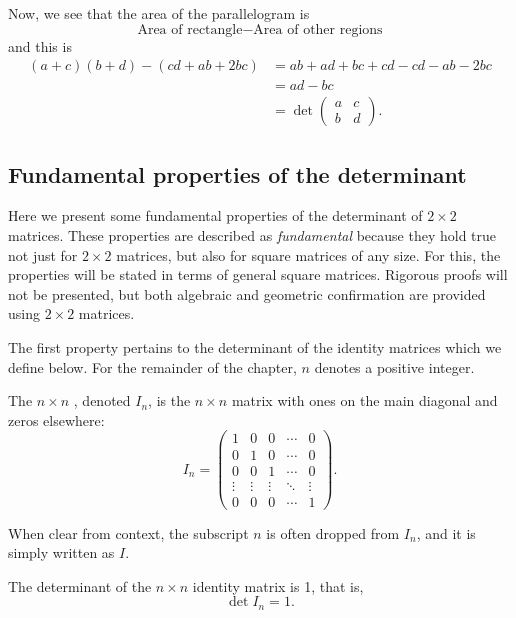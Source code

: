 \documentclass{ximera}
\begin{document}
Now, we see that the area of the parallelogram is
\[
\text{Area of rectangle} - \text{Area of other regions}
\]
and this is
\begin{align*}
  (a+c)(b+d) - \left(cd + ab + 2bc \right)&= ab + ad + bc + cd - cd - ab-2bc\\
  &=  ad - bc\\
  &= \det
  \begin{pmatrix}
    a & c\\
    b & d
  \end{pmatrix}.
\end{align*}

\subsection{Fundamental properties of the determinant}
Here we present some fundamental properties of the determinant of
$2 \times 2$ matrices. These properties are described as
\textit{fundamental} because they hold true not just for $2 \times 2$
matrices, but also for square matrices of any size. For this, the
properties will be stated in terms of general square
matrices. Rigorous proofs will not be presented, but both algebraic
and geometric confirmation are provided using $2 \times 2$ matrices.

The first property pertains to the determinant of the identity
matrices which we define below. For the remainder of the chapter, $n$
denotes a positive integer.

\begin{definition}\label{defn:id}
  The $n \times n$ , denoted $I_n$, is the
  $n \times n$ matrix with ones on the main diagonal and zeros elsewhere:
  \[
    I_n =
    \begin{pmatrix}
      1 & 0 & 0 & \cdots & 0 \\
      0 & 1 & 0 & \cdots & 0 \\
      0 & 0 & 1 & \cdots & 0 \\
      \vdots & \vdots & \vdots & \ddots & \vdots \\
      0 & 0 & 0 & \cdots & 1
    \end{pmatrix}.
  \]
\end{definition}
When clear from context, the subscript $n$ is often dropped from
$I_n$, and it is simply written as $I$.

\begin{proposition}
  The determinant of the $n \times n$ identity matrix is 1, that is,
  \[
    \det I_n = 1.
  \]
\end{proposition}
\end{document}
